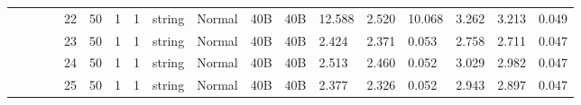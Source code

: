 \begin{landscape}
\begin{table}[]
{\begin{tabular}{@{}ccccllllllllllllll@{}}
                                                                                   &                              &                                &                                                                                                          & 22                                                    & 50                                       & 1                                          & 1                                 & string                           & Normal                             & 40B                                           & 40B                                             & 12.588                  & 2.520    & 10.068                       & 3.262                   & 3.213    & 0.049                        \\
                                                                                   &                              &                                &                                                                                                          & 23                                                    & 50                                       & 1                                          & 1                                 & string                           & Normal                             & 40B                                           & 40B                                             & 2.424                   & 2.371    & 0.053                        & 2.758                   & 2.711    & 0.047                        \\
                                                                                   &                              &                                &                                                                                                          & 24                                                    & 50                                       & 1                                          & 1                                 & string                           & Normal                             & 40B                                           & 40B                                             & 2.513                   & 2.460    & 0.052                        & 3.029                   & 2.982    & 0.047                        \\
                                                                                   &                              &                                &                                                                                                          & 25                                                    & 50                                       & 1                                          & 1                                 & string                           & Normal                             & 40B                                           & 40B                                             & 2.377                   & 2.326    & 0.052                        & 2.943                   & 2.897    & 0.047                        \\

\end{tabular}}
\end{table}
\end{landscape}
